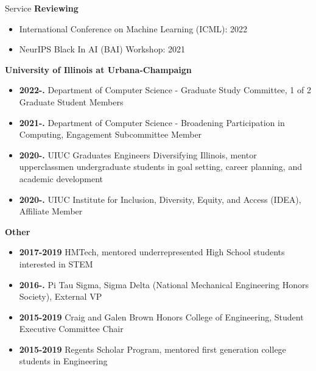 \documentclass{resume} %
\begin{document}

\begin{rSection}{Service}
\textbf{Reviewing}
\begin{itemize}
    \item  International Conference on Machine Learning (ICML): 2022
    \item NeurIPS Black In AI (BAI) Workshop: 2021
\end{itemize}

\textbf{University of Illinois at Urbana-Champaign}
\begin{itemize}
    \item \textbf{2022-.} Department of Computer Science - Graduate Study Committee, 1 of 2 Graduate Student Members
    \item \textbf{2021-.} Department of Computer Science - Broadening Participation in Computing, Engagement Subcommittee Member
    \item \textbf{2020-.} UIUC Graduates Engineers Diversifying Illinois, mentor upperclassmen undergraduate students in goal setting, career planning, and academic development
    \item \textbf{2020-.} UIUC Institute for Inclusion, Diversity, Equity, and Access (IDEA), Affiliate Member
\end{itemize}

\textbf{Other}
\begin{itemize}
    \item \textbf{2017-2019} HMTech, mentored underrepresented High School students interested in STEM
    \item \textbf{2016-.} Pi Tau Sigma, Sigma Delta (National Mechanical Engineering Honors Society), External VP
    \item \textbf{2015-2019} Craig and Galen Brown Honors College of Engineering, Student Executive Committee Chair
    \item \textbf{2015-2019} Regents Scholar Program, mentored first generation college students in Engineering
\end{itemize}
\end{rSection}

\end{document}
